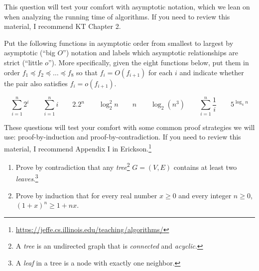 \documentclass[11pt]{article}
\theoremstyle{definition}
\begin{document}
\begin{enumerate}[leftmargin=0pt, itemsep=3ex]

\problemitem This question will test your comfort with asymptotic notation, which we lean on when analyzing the running time of algorithms.  If you need to review this material, I recommend KT Chapter 2.

Put the following functions in asymptotic order from smallest to largest by asymptotic (``big $O$'') notation and labels which asymptotic relationships are strict (``little $o$'').  More specifically, given the eight functions below, put them in order $f_1 \preceq f_2 \preceq \dots \preceq f_{8}$ so that $f_i = O(f_{i+1})$ for each $i$ and indicate whether the pair also satisfies $f_i = o(f_{i+1})$.

\begin{equation*}
    \sum_{i=1}^{n} 2^i \qquad \sum_{i=1}^{n} i \qquad 2.2^n \qquad \log_{2}^{2} n \qquad n \qquad \log_2(n^3) \qquad \sum_{i=1}^{n} \frac{1}{i} \qquad 5^{\log_4 n}
\end{equation*}
    
\problemitem These questions will test your comfort with some common proof strategies we will use: proof-by-induction and proof-by-contradiction.  If you need to review this material, I recommend Appendix I in Erickson.\footnote{\url{https://jeffe.cs.illinois.edu/teaching/algorithms/}}

\begin{enumerate}[leftmargin=0pt, itemsep=3ex]
    \item Prove by contradiction that any \emph{tree}\footnote{A \emph{tree} is an undirected graph that is \emph{connected} and \emph{acyclic}.} $G = (V,E)$ contains at least two \emph{leaves}.\footnote{A \emph{leaf} in a tree is a node with exactly one neighbor.}

    \item Prove by induction that for every real number $x \geq 0$ and every integer $n \geq 0$, $(1+x)^n \geq 1+nx$.
    

\end{enumerate}
\end{enumerate}
\end{document}
